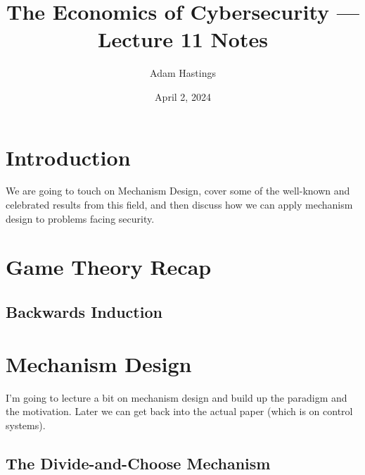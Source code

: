 \documentclass[11pt]{article}
\title{The Economics of Cybersecurity --- Lecture 11 Notes}
\date{April 2, 2024}
\author{Adam Hastings}
\begin{document}
\maketitle

\section{Introduction}

We are going to touch on Mechanism Design, cover some of the well-known and celebrated results from this field, and then discuss how we can apply mechanism design to problems facing security.

\section{Game Theory Recap}

\subsection{Backwards Induction}



\section{Mechanism Design}

I'm going to lecture a bit on mechanism design and build up the paradigm and the motivation.
Later we can get back into the actual paper (which is on control systems).

\subsection{The Divide-and-Choose Mechanism}
\end{document}
